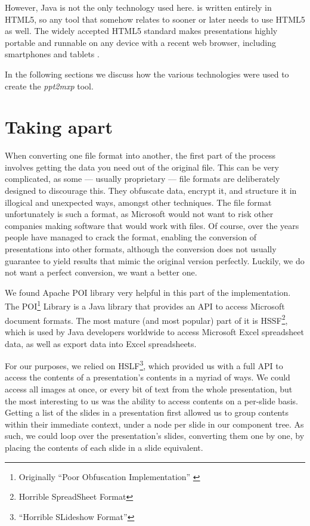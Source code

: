   However, Java is not the only technology used here. \mxp is written entirely
  in HTML5, so any tool that somehow relates to \mxp sooner or later needs to
  use HTML5 as well. The widely accepted HTML5 standard makes \mxp
  presentations highly portable and runnable on any device with a recent web
  browser, including smartphones and tablets \citep{roels-1}.

  In the following sections we discuss how the various technologies were used
  to create the \emph{ppt2mxp} tool.

  \section{Taking \ppt apart}
   \label{poi}

   When converting one file format into another, the first part of the process
   involves getting the data you need out of the original file. This can be
   very complicated, as some --- usually proprietary --- file formats are
   deliberately designed to discourage this. They obfuscate data, encrypt it,
   and structure it in illogical and unexpected ways, amongst other techniques.
   The \ppt file format unfortunately is such a format, as Microsoft would not
   want to risk other companies making software that would work with \ppt
   files. Of course, over the years people have managed to crack the format,
   enabling the conversion of \ppt presentations into other formats, although
   the conversion does not usually guarantee to yield results that mimic the
   original version perfectly. Luckily, we do not want a perfect conversion, we
   want a better one.

   We found Apache POI library very helpful in this part of the implementation.
   The POI\footnote{Originally ``Poor Obfuscation Implementation''
   \citep{sundaram-1}} Library is a Java library that provides an API to access
   Microsoft document formats. The most mature (and most popular) part of it is
   HSSF\footnote{Horrible SpreadSheet Format}, which is used by Java developers
   worldwide to access Microsoft Excel spreadsheet data, as well as export data
   into Excel spreadsheets.

   For our purposes, we relied on HSLF\footnote{``Horrible SLideshow Format''},
   which provided us with a full API to access the contents of a \ppt
   presentation's contents in a myriad of ways. We could access all images at
   once, or every bit of text from the whole presentation, but the most
   interesting to us was the ability to access contents on a per-slide basis.
   Getting a list of the slides in a presentation first allowed us to group
   contents within their immediate context, under a node per slide in our
   component tree. As such, we could loop over the presentation's slides,
   converting them one by one, by placing the contents of each slide in a \mxp
   slide equivalent.

